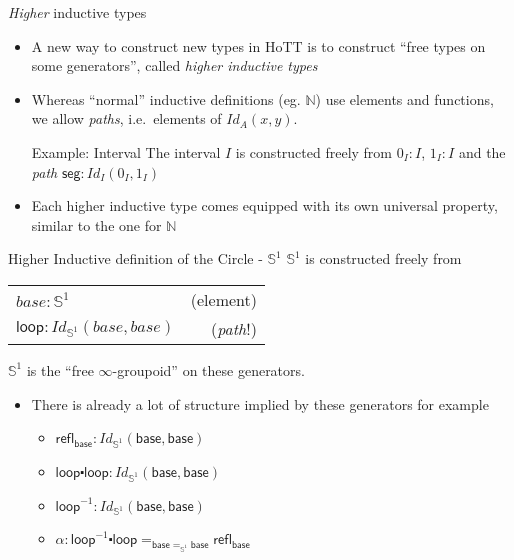 \documentclass{beamer}
\newcommand{\NN}{\mathbb{N}}
\newcommand{\SSS}{\mathbb{S}}
\newcommand{\refl}{\mathsf{refl}}
\newcommand{\base}{\mathsf{base}}
\begin{document}
\begin{frame}{\emph{Higher} inductive types}
	\begin{itemize}
	\pause\item A new way to construct new types in HoTT is to construct ``free types on some generators'', called \textit{higher inductive types}
	\pause\item Whereas ``normal'' inductive definitions (eg. $\NN$) use elements and functions, we allow \emph{paths}, i.e.\ elements of $Id_A(x,y)$.
	
	\pause\begin{block}{Example: Interval} The interval $I$ is constructed freely from $0_I:I$, $1_I:I$ and the \emph{path} $\mathsf{seg}: Id_I(0_I,1_I)$	
	\end{block}
	\pause\item Each higher inductive type comes equipped with its own universal property, similar to the one for $\NN$
	\end{itemize}
\end{frame}


\begin{frame}{Higher Inductive definition of the Circle - $\SSS^1$}
$\mathbb{S}^1$ is constructed freely from
\begin{center}
	\begin{tabular}{lr}
	$base : \SSS^1$ 						&  (element) \\
	$\mathsf{loop} : Id_{\SSS^1}(base,base)$ 	&  (\emph{path}!) 
	\end{tabular}
	\end{center}
	
\pause $\SSS^1$ is the ``free $\infty$-groupoid''  on these generators. 

\begin{itemize}
	\pause\item There is already a lot of structure implied by these generators for example
			\begin{itemize}
			\item $\refl_{\base} : Id_{\SSS^1}(\base,\base)$
			\item $\mathsf{loop} \centerdot \mathsf{loop} : Id_{\SSS^1}(\base,\base)$
			\item $\mathsf{loop}^{-1} : Id_{\SSS^1}(\base,\base)$
			\item $\alpha : \mathsf{loop}^{-1} \centerdot \mathsf{loop} =_{\base =_{\SSS^1} \base} \refl_{\base}$
			\end{itemize}
\end{itemize}
\end{frame}
\end{document}
